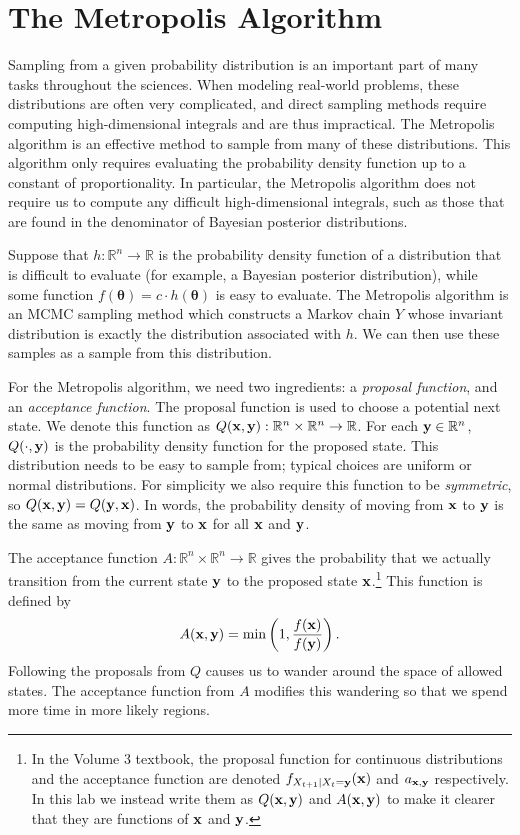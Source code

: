 \labdependencies{}

\section*{The Metropolis Algorithm}
Sampling from a given probability distribution is an important part of many tasks throughout the sciences.
When modeling real-world problems, these distributions are often very complicated, and direct sampling methods require computing high-dimensional integrals and are thus impractical.
The Metropolis algorithm is an effective method to sample from many of these distributions.
This algorithm only requires evaluating the probability density function up to a constant of proportionality.
In particular, the Metropolis algorithm does not require us to compute any difficult high-dimensional integrals, such as those that are found
in the denominator of Bayesian posterior distributions.

Suppose that $h : \mathbb{R}^n \rightarrow \mathbb{R}$ is the probability density function of a distribution that is difficult to evaluate (for example, a Bayesian posterior distribution), while some function $f(\boldsymbol{\theta}) = c \cdot h(\boldsymbol{\theta})$ is easy to evaluate.
The Metropolis algorithm is an MCMC sampling method which constructs a Markov chain $Y$ whose invariant distribution is exactly the distribution associated with $h$.
We can then use these samples as a sample from this distribution.

For the Metropolis algorithm, we need two ingredients: a \emph{proposal function}, and an \emph{acceptance function}.
The proposal function is used to choose a potential next state.
We denote this function as $Q(\mathbf{x},\mathbf{y}): \mathbb{R}^n \times \mathbb{R}^n \rightarrow \mathbb{R}$.
For each $\mathbf{y}\in \mathbb{R}^n$, $Q(\cdot, \mathbf{y})$ is the probability density function for the proposed state.
This distribution needs to be easy to sample from; typical choices are uniform or normal distributions.
For simplicity we also require this function to be \emph{symmetric}, so $Q(\mathbf{x},\mathbf{y})=Q(\mathbf{y},\mathbf{x})$.
In words, the probability density of moving from $\mathbf{x}$ to $\mathbf{y}$ is the same as moving from $\mathbf{y}$ to $\mathbf{x}$ for all $\mathbf{x}$ and $\mathbf{y}$.

The acceptance function $A : \mathbb{R}^n \times \mathbb{R}^n \rightarrow \mathbb{R}$ gives the probability that we actually transition from the current state $\mathbf{y}$ to the proposed state $\mathbf{x}$.\footnote{In the Volume 3 textbook, the proposal function for continuous distributions and the acceptance function are denoted $f_{X_{t+1}|X_t=\mathbf{y}}(\mathbf{x})$ and $a_{\mathbf{x},\mathbf{y}}$ respectively. In this lab we instead write them as $Q(\mathbf{x},\mathbf{y})$ and $A(\mathbf{x},\mathbf{y})$ to make it clearer that they are functions of $\mathbf{x}$ and $\mathbf{y}$.}
This function is defined by
\[
A(\mathbf{x},\mathbf{y}) = \min\left(1, \frac{f(\mathbf{x})}{f(\mathbf{y})}\right).
\]
Following the proposals from $Q$ causes us to wander around the space of allowed states.
The acceptance function from $A$ modifies this wandering so that we spend more time in more likely regions.

